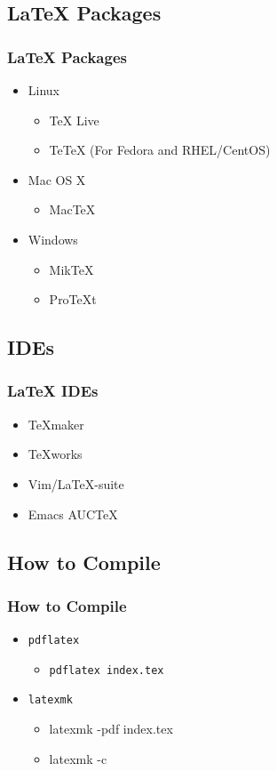
\subsection{\LaTeX{} Packages}

\begin{frame}
\frametitle{\LaTeX{} Packages}
\begin{itemize}
    \item Linux
    \begin{itemize}
        \item TeX Live
        \item TeTeX (For Fedora and RHEL/CentOS)
    \end{itemize}
    \item Mac OS X
    \begin{itemize}
        \item MacTeX
    \end{itemize}
    \item Windows
    \begin{itemize}
        \item MikTeX
        \item ProTeXt
    \end{itemize}
\end{itemize}
\end{frame}

\subsection{IDEs}

\begin{frame}
\frametitle{\LaTeX{} IDEs}
\begin{itemize}
    \item TeXmaker
    \item TeXworks
    \item Vim/LaTeX-suite
    \item Emacs AUCTeX
\end{itemize}
\end{frame}

\subsection{How to Compile}

\begin{frame}
\frametitle{How to Compile}
\begin{itemize}
    \item \texttt{pdflatex}
    \begin{itemize}
        \item \texttt{pdflatex index.tex}
    \end{itemize}
    \item \texttt{latexmk}
    \begin{itemize}
        \item latexmk -pdf index.tex
        \item latexmk -c
    \end{itemize}
\end{itemize}
\end{frame}
